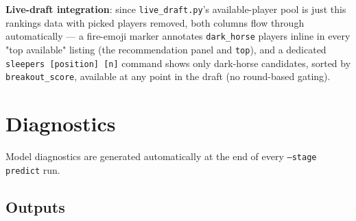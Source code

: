 \documentclass[11pt, a4paper]{article}
\begin{document}
\textbf{Live-draft integration}: since \texttt{live\_draft.py}'s available-player pool is just
this rankings data with picked players removed, both columns flow through automatically — a
fire-emoji marker annotates \texttt{dark\_horse} players inline in every "top available" listing
(the recommendation panel and \texttt{top}), and a dedicated \texttt{sleepers [position] [n]}
command shows only dark-horse candidates, sorted by \texttt{breakout\_score}, available at any
point in the draft (no round-based gating).


\section{Diagnostics}
\label{sec:diagnostics}

Model diagnostics are generated automatically at the end of every \texttt{--stage predict} run.

\subsection{Outputs}
\end{document}

